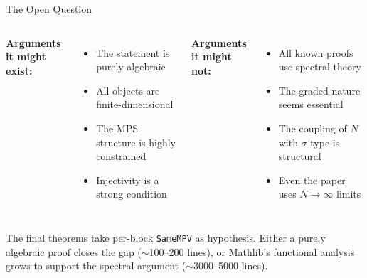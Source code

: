 \documentclass[aspectratio=169,10pt]{beamer}
\begin{document}
\begin{frame}{The Open Question}
\vspace{-0.2em}
\begin{center}
\end{center}

\vspace{0.3em}
\begin{columns}[T]
{\small\textbf{Arguments it might exist:}}
\begin{itemize}\itemsep0.1em
  \item {\small The statement is purely algebraic}
  \item {\small All objects are finite-dimensional}
  \item {\small The MPS structure is highly constrained}
  \item {\small Injectivity is a strong condition}
\end{itemize}

{\small\textbf{Arguments it might not:}}
\begin{itemize}\itemsep0.1em
  \item {\small All known proofs use spectral theory}
  \item {\small The graded nature seems essential}
  \item {\small The coupling of $N$ with $\sigma$-type is structural}
  \item {\small Even the paper uses $N \to \infty$ limits}
\end{itemize}
\end{columns}

\vspace{0.5em}
{\small The final theorems take per-block \texttt{SameMPV} as hypothesis. Either a purely algebraic proof closes the gap ($\sim$100--200 lines), or Mathlib's functional analysis grows to support the spectral argument ($\sim$3000--5000 lines).}
\end{frame}
\end{document}
